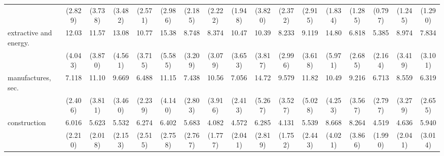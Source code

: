 {\begin{tabular}{l*{16}{c}}
                    &     (2.829)         &     (3.738)         &     (3.482)         &     (2.571)         &     (2.986)         &     (2.185)         &     (2.222)         &     (1.948)         &     (3.820)         &     (2.372)         &     (2.915)         &     (1.834)         &     (1.285)         &     (0.797)         &     (1.245)         &     (1.290)         \\
[1em]
extractive and energy.&       12.03\sym{***}&       11.57\sym{***}&       13.08\sym{***}&       10.77\sym{***}&       15.38\sym{***}&       8.748\sym{***}&       8.374\sym{***}&       10.47\sym{***}&       10.39\sym{***}&       8.233\sym{***}&       9.119\sym{***}&       14.80\sym{***}&       6.818\sym{***}&       5.385\sym{***}&       8.974\sym{***}&       7.834\sym{***}\\
                    &     (4.043)         &     (3.870)         &     (4.561)         &     (3.715)         &     (5.585)         &     (3.209)         &     (3.079)         &     (3.653)         &     (3.817)         &     (2.996)         &     (3.618)         &     (5.971)         &     (2.685)         &     (2.164)         &     (3.419)         &     (3.101)         \\
[1em]
manufactures, sec.  &       7.118\sym{***}&       11.10\sym{***}&       9.669\sym{***}&       6.488\sym{***}&       11.15\sym{***}&       7.438\sym{***}&       10.56\sym{***}&       7.056\sym{***}&       14.72\sym{***}&       9.579\sym{***}&       11.82\sym{***}&       10.49\sym{***}&       9.216\sym{***}&       6.713\sym{***}&       8.559\sym{***}&       6.319\sym{***}\\
                    &     (2.406)         &     (3.811)         &     (3.460)         &     (2.239)         &     (4.140)         &     (2.803)         &     (3.916)         &     (2.413)         &     (5.267)         &     (3.527)         &     (5.028)         &     (4.253)         &     (3.567)         &     (2.797)         &     (3.279)         &     (2.655)         \\
[1em]
construction        &       6.016\sym{***}&       5.623\sym{***}&       5.532\sym{***}&       6.274\sym{***}&       6.402\sym{***}&       5.683\sym{***}&       4.082\sym{**} &       4.572\sym{***}&       6.285\sym{***}&       4.131\sym{***}&       5.539\sym{***}&       8.668\sym{***}&       8.264\sym{***}&       4.519\sym{***}&       4.636\sym{***}&       5.940\sym{***}\\
                    &     (2.210)         &     (2.018)         &     (2.153)         &     (2.515)         &     (2.758)         &     (2.767)         &     (1.777)         &     (2.041)         &     (2.819)         &     (1.752)         &     (2.443)         &     (4.021)         &     (3.866)         &     (1.990)         &     (2.041)         &     (3.014)         \\

\end{tabular}}
